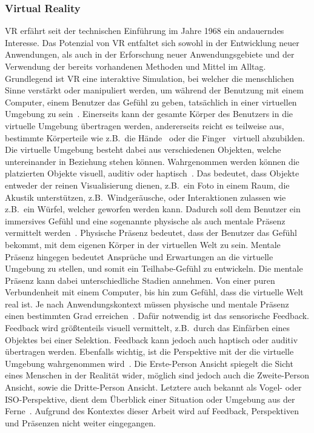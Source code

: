 \subsubsection{Virtual Reality}
VR erfährt seit der technischen Einführung im Jahre 1968 ein andauerndes Interesse. Das Potenzial von VR entfaltet sich sowohl in der Entwicklung neuer Anwendungen, als auch in der Erforschung neuer Anwendungsgebiete und der Verwendung der bereits vorhandenen Methoden und Mittel im Alltag. Grundlegend ist VR eine interaktive Simulation, bei welcher die menschlichen Sinne verstärkt oder manipuliert werden, um während der Benutzung mit einem Computer, einem Benutzer das Gefühl zu geben, tatsächlich in einer virtuellen Umgebung zu sein~\cite{virtualreality}. Einerseits kann der gesamte Körper des Benutzers in die virtuelle Umgebung übertragen werden, andererseits reicht es teilweise aus, bestimmte Körperteile wie z.B.~die Hände~\cite{handtracking} oder die Finger~\cite{virtualrealityandgames} virtuell abzubilden. Die virtuelle Umgebung besteht dabei aus verschiedenen Objekten, welche untereinander in Beziehung stehen können. Wahrgenommen werden können die platzierten Objekte visuell, auditiv oder haptisch~\cite{virtualreality}. Das bedeutet, dass Objekte entweder der reinen Visualisierung dienen, z.B.~ein Foto in einem Raum, die Akustik unterstützen, z.B.~Windgeräusche, oder Interaktionen zulassen wie z.B.~ein Würfel, welcher geworfen werden kann. Dadurch soll dem Benutzer ein immersives Gefühl und eine sogenannte physische als auch mentale Präsenz vermittelt werden~\cite{hmds}. Physische Präsenz bedeutet, dass der Benutzer das Gefühl bekommt, mit dem eigenen Körper in der virtuellen Welt zu sein. Mentale Präsenz hingegen bedeutet Ansprüche und Erwartungen an die virtuelle Umgebung zu stellen, und somit ein Teilhabe-Gefühl zu entwickeln. Die mentale Präsenz kann dabei unterschiedliche Stadien annehmen. Von einer puren Verbundenheit mit einem Computer, bis hin zum Gefühl, dass die virtuelle Welt real ist. Je nach Anwendungskontext müssen physische und mentale Präsenz einen bestimmten Grad erreichen~\citep{virtualreality}. Dafür notwendig ist das sensorische Feedback. Feedback wird größtenteils visuell vermittelt, z.B.~durch das Einfärben eines Objektes bei einer Selektion. Feedback kann jedoch auch haptisch oder auditiv übertragen werden. Ebenfalls wichtig, ist die Perspektive mit der die virtuelle Umgebung wahrgenommen wird~\cite{virtualreality}. Die Erste-Person Ansicht spiegelt die Sicht eines Menschen in der Realität wider, möglich sind jedoch auch die Zweite-Person Ansicht, sowie die Dritte-Person Ansicht. Letztere auch bekannt als Vogel- oder ISO-Perspektive, dient dem Überblick einer Situation oder Umgebung aus der Ferne~\cite{virtualreality}. Aufgrund des Kontextes dieser Arbeit wird auf Feedback, Perspektiven und Präsenzen nicht weiter eingegangen.\\


